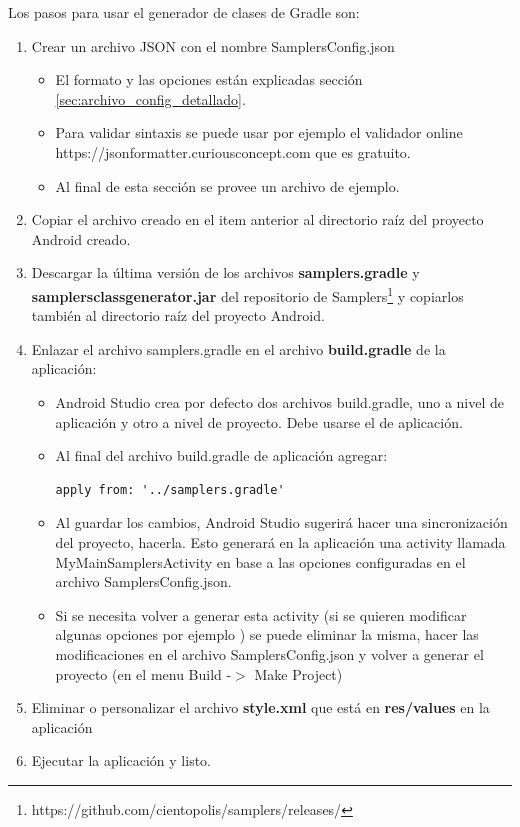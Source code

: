 Los pasos para usar el generador de clases de Gradle son:
\begin{enumerate}
	\item Crear un archivo JSON con el nombre SamplersConfig.json
		\begin{itemize}
			\item El formato y las opciones están explicadas sección \ref{sec:archivo_config_detallado}.
			\item Para validar sintaxis se puede usar por ejemplo el validador online https://jsonformatter.curiousconcept.com que es gratuito.
			\item Al final de esta sección se provee un archivo de ejemplo.
		\end{itemize}
		
	\item Copiar el archivo creado en el item anterior al directorio raíz del proyecto Android creado.
	
	\item Descargar la última versión de los archivos \textbf{samplers.gradle} y \textbf{samplersclassgenerator.jar} del repositorio de Samplers\footnote{https://github.com/cientopolis/samplers/releases/} y copiarlos también al directorio raíz del proyecto Android.
	
	\item Enlazar el archivo samplers.gradle en el archivo \textbf{build.gradle} de la aplicación:
		\begin{itemize}
			\item Android Studio crea por defecto dos archivos build.gradle, uno a nivel de aplicación y otro a nivel de proyecto. Debe usarse el de aplicación.
			\item Al final del archivo build.gradle de aplicación agregar:
\begin{lstlisting}[language=XML, frame=tlbr]
apply from: '../samplers.gradle'
\end{lstlisting}
			\item Al guardar los cambios, Android Studio sugerirá hacer una sincronización del proyecto, hacerla. Esto generará en la aplicación una activity llamada MyMainSamplersActivity en base a las opciones configuradas en el archivo SamplersConfig.json.
			\item Si se necesita volver a generar esta activity (si se quieren modificar algunas opciones por ejemplo ) se puede eliminar la misma, hacer las modificaciones en el archivo SamplersConfig.json y volver a generar el proyecto (en el menu Build -$>$ Make Project)
		\end{itemize}
		
	\item Eliminar o personalizar el archivo \textbf{style.xml} que está en \textbf{res/values} en la aplicación
	
	\item Ejecutar la aplicación y listo.

\end{enumerate}


